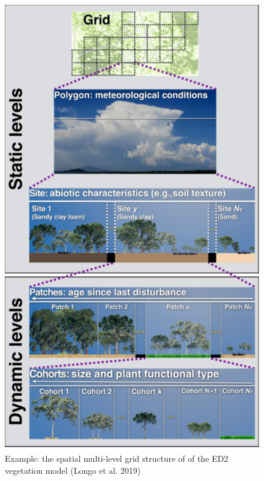 \documentclass[
  oneside]{book}
\begin{document}
\begin{figure}

{\centering \includegraphics[width=0.8\linewidth]{figures/chap1/grid_ED2} 

}

\caption{Example: the spatial multi-level grid structure of of the ED2 vegetation model (Longo et al. 2019)}\label{fig:f11}
\end{figure}
\end{document}
